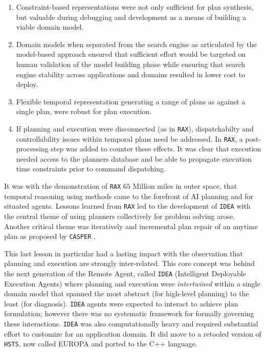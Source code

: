\begin{enumerate}

\item Constraint-based representations were not only sufficient for
  plan synthesis, but valuable during debugging and development as a
  means of building a viable domain model.

\item Domain models when separated from the search engine as
  articulated by the model-based approach \cite{williams96a} ensured
  that sufficient effort would be targeted on human validation of the
  model building phase while ensuring that search engine stability
  across applications and domains resulted in lower cost to deploy.

\item Flexible temporal representation generating a range of plans as
  against a single plan, were robust for plan execution.

\item If planning and execution were disconnected (as in
  \texttt{RAX}), dispatchabilty \cite{mus98a} and controllability
  \cite{morris00} issues within temporal plans need be addressed. In
  \texttt{RAX}, a post-processing step was added to counter these
  effects. It was clear that execution needed access to the planners
  database and be able to propagate execution time constraints prior
  to command dispatching.

\end{enumerate}

It was with the demonstration of \texttt{RAX} $65$ Million miles in
outer space, that temporal reasoning using methods came to the
forefront of AI planning and for situated agents. Lessons learned from
\texttt{RAX} led to the development of \texttt{IDEA}
\cite{mus02,mus04} with the central theme of using planners
collectively for problem solving arose. Another critical theme was
iteratively and incremental plan repair of an anytime plan
\cite{Zaimag96} as proposed by \texttt{CASPER}
\cite{chien00}.

This last lesson in particular had a lasting impact with the
observation that planning and execution are strongly
inter-related. This core concept was behind the next generation of the
Remote Agent, called \texttt{IDEA} (Intelligent Deployable Execution
Agents) where planning and execution were \emph{intertwined} within a
single domain model that spanned the most abstract (for high-level
planning) to the least (for diagnosis). \texttt{IDEA} \cite{mus02,
  mus04} agents were expected to interact to achieve plan formulation;
however there was no systematic framework for formally governing these
interactions. \texttt{IDEA} was also computationally heavy and
required substantial effort to customize for an application domain. It
did move to a retooled version of \texttt{HSTS}, now called EUROPA
\cite{frank2003, barreiro09} and ported to the C++ language.

